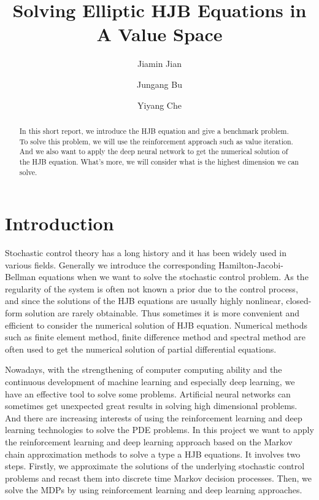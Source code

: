 \documentclass[12pt]{article}
\title{Solving Elliptic HJB Equations in A Value Space}
\author{Jiamin Jian \and Jungang Bu \and Yiyang Che}
\date{}
\begin{document}
\maketitle

\begin{abstract}
In this short report, we introduce the HJB equation and give a benchmark problem. To solve this problem, we will use the reinforcement approach such as value iteration. And we also want to apply the deep neural network to get the numerical solution of the HJB equation. What's more, we will consider what is the highest dimension we can solve.
\end{abstract}


\section{Introduction}\label{section-introduction}

Stochastic control theory has a long history and it has been widely used in various fields. Generally we introduce the corresponding Hamilton-Jacobi-Bellman equations when we want to solve the stochastic control problem. As the regularity of the system is often not known a prior due to the control process, and since the solutions of the HJB equations are usually highly nonlinear, closed-form solution are rarely obtainable. Thus sometimes it is more convenient and efficient to consider the numerical solution of HJB equation. Numerical methods such as finite element method, finite difference method and spectral method are often used to get the numerical solution of partial differential equations.

Nowadays, with the strengthening of computer computing ability and the continuous development of machine learning and especially deep learning, we have an effective tool to solve some problems. Artificial neural networks can sometimes get unexpected great results in solving high dimensional problems. And there are increasing interests of using the reinforcement learning and deep learning technologies to solve the PDE problems. In this project we want to apply the  reinforcement learning and deep learning approach based on the Markov chain approximation methods to solve a type a HJB equations. It involves two steps. Firstly, we approximate the solutions of the underlying stochastic control problems and recast them into discrete time Markov decision processes. Then, we solve the MDPs by using reinforcement learning and deep learning approaches.
\end{document}
